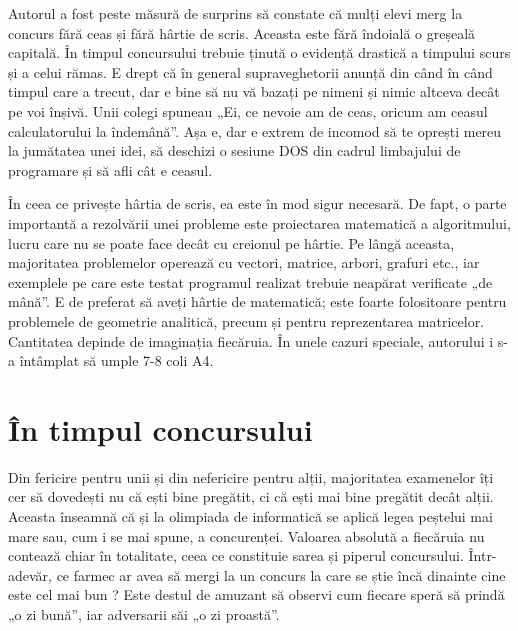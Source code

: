 Autorul a fost peste măsură de surprins să constate că mulți elevi merg la
concurs fără ceas și fără hârtie de scris. Aceasta este fără îndoială o
greșeală capitală. În timpul concursului trebuie ținută o evidență drastică a
timpului scurs și a celui rămas. E drept că în general supraveghetorii anunță
din când în când timpul care a trecut, dar e bine să nu vă bazați pe nimeni și
nimic altceva decât pe voi înșivă. Unii colegi spuneau „Ei, ce nevoie am de
ceas, oricum am ceasul calculatorului la îndemână”. Așa e, dar e extrem de
incomod să te oprești mereu la jumătatea unei idei, să deschizi o sesiune DOS
din cadrul limbajului de programare și să afli cât e ceasul.

În ceea ce privește hârtia de scris, ea este în mod sigur necesară. De fapt, o
parte importantă a rezolvării unei probleme este proiectarea matematică a
algoritmului, lucru care nu se poate face decât cu creionul pe hârtie. Pe
lângă aceasta, majoritatea problemelor operează cu vectori, matrice, arbori,
grafuri etc., iar exemplele pe care este testat programul realizat trebuie
neapărat verificate „de mână”. E de preferat să aveți hârtie de matematică;
este foarte folositoare pentru problemele de geometrie analitică, precum și
pentru reprezentarea matricelor. Cantitatea depinde de imaginația
fiecăruia. În unele cazuri speciale, autorului i s-a întâmplat să umple 7-8
coli A4.

\section{În timpul concursului}

Din fericire pentru unii și din nefericire pentru alții, majoritatea
examenelor îți cer să dovedești nu că ești bine pregătit, ci că ești mai bine
pregătit decât alții. Aceasta înseamnă că și la olimpiada de informatică se
aplică legea peștelui mai mare sau, cum i se mai spune, a
concurenței. Valoarea absolută a fiecăruia nu contează chiar în totalitate,
ceea ce constituie sarea și piperul concursului. Într-adevăr, ce farmec ar
avea să mergi la un concurs la care se știe încă dinainte cine este cel mai
bun ? Este destul de amuzant să observi cum fiecare speră să prindă „o zi
bună”, iar adversarii săi „o zi proastă”.

